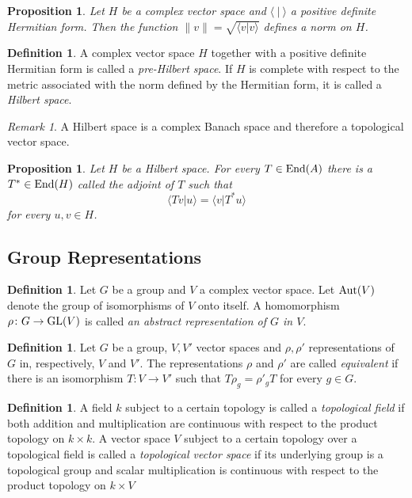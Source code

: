 \documentclass[12pt]{article}
\newtheorem{prop}[thm]{Proposition}
\theoremstyle{definition}
\newtheorem{dfn}[thm]{Definition}
\theoremstyle{remark}
\newtheorem{rem}[thm]{Remark}
\newcommand{\End}[1]{\textup{End}(#1)}
\begin{document}
    \begin{prop}
        Let $H$ be a complex vector space and $\langle\ |\ \rangle$ a positive definite Hermitian form. Then the function $\|v\|=\sqrt{\langle v|v \rangle}$ defines a norm on $H$.
    \end{prop}

    \begin{dfn}
        A complex vector space $H$ together with a positive definite Hermitian form is called a \emph{pre-Hilbert space}. If $H$ is complete with respect to the metric associated with the norm defined by the Hermitian form, it is called a \emph{Hilbert space}.
    \end{dfn}

    \begin{rem}
        A Hilbert space is a complex Banach space and therefore a topological vector space.
    \end{rem}

    \begin{prop}
        Let $H$ be a Hilbert space. For every $T\in\End{A}$ there is a $T^*\in\End{H}$ called the \emph{adjoint of $T$} such that
        $$
        \langle Tv|u \rangle = \langle v|T^*u \rangle
        $$
        for every $u,v\in H$.
    \end{prop}

    \subsection{Group Representations}

    \begin{dfn}
        Let $G$ be a group and $V$ a complex vector space. Let $\textup{Aut}(V)$ denote the group of isomorphisms of $V$ onto itself. A homomorphism $\rho\colon G\to\textup{GL}(V)$ is called \emph{an abstract representation of $G$ in $V$}.
    \end{dfn}

    \begin{dfn}
        Let $G$ be a group, $V,V'$ vector spaces and $\rho,\rho'$ representations of $G$ in, respectively, $V$ and $V'$. The representations $\rho$ and $\rho'$ are called \emph{equivalent} if there is an isomorphism $T\colon V \to V'$ such that
        $ T\rho_g=\rho'_gT $
        for every $g \in G$.
    \end{dfn}

    \begin{dfn}
        A field $k$ subject to a certain topology is called a \emph{topological field} if both addition and multiplication are continuous with respect to the product topology on $k\times k$. A vector space $V$ subject to a certain topology over a topological field is called a \emph{topological vector space} if its underlying group is a topological group and scalar multiplication is continuous with respect to the product topology on $k \times V$
    \end{dfn}
\end{document}
